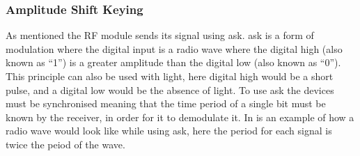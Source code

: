 \subsubsection{Amplitude Shift Keying}

As mentioned the RF module sends its signal using \gls{ask}.
\gls{ask} is a form of modulation where the digital input is a radio wave where the digital high (also known as ``1'') is a greater amplitude than the digital low (also known as ``0'').
This principle can also be used with light, here digital high would be a short pulse, and a digital low would be the absence of light. 
To use \gls{ask} the devices must be synchronised meaning that the time period of a single bit must be known by the receiver, in order for it to demodulate it. 
In  is an example of how a radio wave would look like while using \gls{ask}, here the period for each signal is twice the peiod of the wave. \cite{ASKnFSK}

